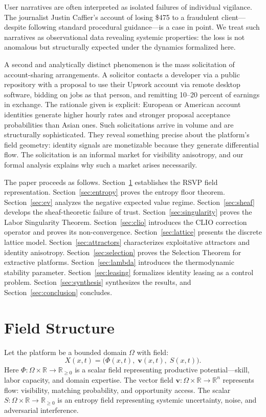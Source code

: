 \documentclass[11pt]{article}
\begin{document}
User narratives are often interpreted as isolated failures of individual
vigilance. The journalist Justin Caffier's account of losing \$475 to a
fraudulent client---despite following standard procedural guidance---is a
case in point. We treat such narratives as observational data revealing
systemic properties: the loss is not anomalous but structurally expected
under the dynamics formalized here.

A second and analytically distinct phenomenon is the mass solicitation of
account-sharing arrangements. A solicitor contacts a developer via a public
repository with a proposal to use their Upwork account via remote desktop
software, bidding on jobs as that person, and remitting 10--20 percent of
earnings in exchange. The rationale given is explicit: European or American
account identities generate higher hourly rates and stronger proposal
acceptance probabilities than Asian ones. Such solicitations arrive in volume
and are structurally sophisticated. They reveal something precise about the
platform's field geometry: identity signals are monetizable because they
generate differential flow. The solicitation is an informal market for
visibility anisotropy, and our formal analysis explains why such a market
arises necessarily.

The paper proceeds as follows. Section~\ref{sec:field} establishes the RSVP
field representation. Section~\ref{sec:entropy} proves the entropy floor
theorem. Section~\ref{sec:ev} analyzes the negative expected value regime.
Section~\ref{sec:sheaf} develops the sheaf-theoretic failure of trust.
Section~\ref{sec:singularity} proves the Labor Singularity Theorem.
Section~\ref{sec:clio} introduces the CLIO correction operator and proves
its non-convergence. Section~\ref{sec:lattice} presents the discrete lattice
model. Section~\ref{sec:attractors} characterizes exploitative attractors and
identity anisotropy. Section~\ref{sec:selection} proves the Selection Theorem
for extractive platforms. Section~\ref{sec:lambda} introduces the
thermodynamic stability parameter. Section~\ref{sec:leasing} formalizes
identity leasing as a control problem. Section~\ref{sec:synthesis}
synthesizes the results, and Section~\ref{sec:conclusion} concludes.

\section{Field Structure}
\label{sec:field}

Let the platform be a bounded domain $\Omega$ with field:
\[
X(x,t) = \bigl(\Phi(x,t),\;\mathbf{v}(x,t),\;S(x,t)\bigr).
\]
Here $\Phi : \Omega \times \mathbb{R} \to \mathbb{R}_{\geq 0}$ is a scalar
field representing productive potential---skill, labor capacity, and domain
expertise. The vector field $\mathbf{v} : \Omega \times \mathbb{R} \to
\mathbb{R}^n$ represents flow: visibility, matching probability, and
opportunity access. The scalar $S : \Omega \times \mathbb{R} \to
\mathbb{R}_{\geq 0}$ is an entropy field representing systemic uncertainty,
noise, and adversarial interference.
\end{document}
